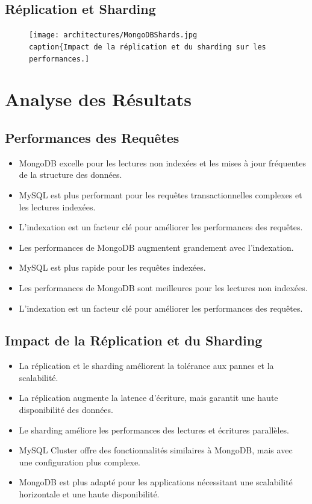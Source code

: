 \documentclass[a4paper,12pt]{report}
\begin{document}
\section{Réplication et Sharding}
\begin{figure}[H]
    \centering
    \texttt{[image: architectures/MongoDBShards.jpg
    \\caption\{Impact de la réplication et du sharding sur les performances.]}
    \label{fig:replication_sharding}
\end{figure}

\chapter{Analyse des Résultats}
\section{Performances des Requêtes}
\begin{itemize}
	\item MongoDB excelle pour les lectures non indexées et les mises à jour fréquentes de la structure des données.
	\item MySQL est plus performant pour les requêtes transactionnelles complexes et les lectures indexées.
	\item L'indexation est un facteur clé pour améliorer les performances des requêtes.
	\item Les performances de MongoDB augmentent grandement avec l'indexation.
	\item MySQL est plus rapide pour les requêtes indexées.
	\item Les performances de MongoDB sont meilleures pour les lectures non indexées.
	\item L'indexation est un facteur clé pour améliorer les performances des requêtes.
\end{itemize}
\section{Impact de la Réplication et du Sharding}
\begin{itemize}
	\item La réplication et le sharding améliorent la tolérance aux pannes et la scalabilité.
	\item La réplication augmente la latence d'écriture, mais garantit une haute disponibilité des données.
	\item Le sharding améliore les performances des lectures et écritures parallèles.
	\item MySQL Cluster offre des fonctionnalités similaires à MongoDB, mais avec une configuration plus complexe.
	\item MongoDB est plus adapté pour les applications nécessitant une scalabilité horizontale et une haute disponibilité.
\end{itemize}
\end{document}
